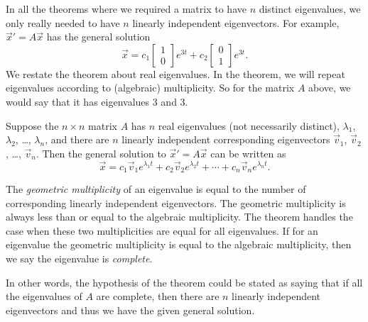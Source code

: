In all the
theorems where we required a matrix to have $n$ distinct eigenvalues, we only
really needed to have $n$ linearly independent eigenvectors.  For example,
${\vec{x}}' = A\vec{x}$ has the general solution
\begin{equation*}
\vec{x} = 
c_1 \begin{bmatrix} 1 \\ 0 \end{bmatrix} e^{3t}
+ c_2 \begin{bmatrix} 0 \\ 1 \end{bmatrix} e^{3t} .
\end{equation*}
We restate the theorem about real eigenvalues.  In the theorem,
we will repeat eigenvalues according to (algebraic) multiplicity.  So
for the matrix $A$ above, we would say that it has eigenvalues 3 and 3.

\begin{theorem}
Suppose the $n \times n$ matrix $A$ 
has $n$ real eigenvalues (not necessarily distinct), $\lambda_1$,
$\lambda_2$, \ldots, $\lambda_n$,
and there are $n$ linearly independent corresponding eigenvectors
$\vec{v}_1$, $\vec{v}_2$, \ldots, $\vec{v}_n$.  Then the general solution to 
${\vec{x}}' = A\vec{x}$
can be written as
\begin{equation*}
\vec{x} = c_1 \vec{v}_1 e^{\lambda_1 t} +
c_2 \vec{v}_2 e^{\lambda_2 t} + \cdots +
c_n \vec{v}_n e^{\lambda_n t} .
\end{equation*}
\end{theorem}

The \emph{geometric multiplicity} of an eigenvalue
is equal to the number of corresponding linearly independent eigenvectors.
The geometric multiplicity is always less than or
equal to the algebraic multiplicity.  The theorem handles the case
when these two multiplicities are equal for all eigenvalues.
If for an eigenvalue the geometric multiplicity is equal
to the algebraic multiplicity, then we say the eigenvalue is
\emph{complete}.

In other words, 
the hypothesis of the theorem could be stated as saying that if all
the eigenvalues of $A$ are complete, then there are $n$ linearly independent
eigenvectors and thus we have the given general solution.

\medskip


